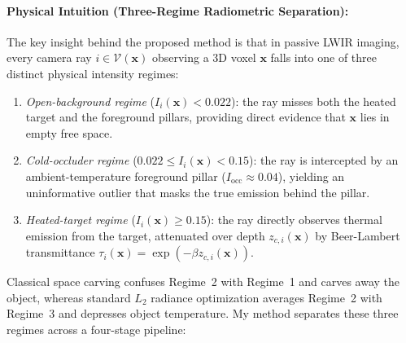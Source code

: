\documentclass[12pt,letterpaper]{article}
\begin{document}
\paragraph{Physical Intuition (Three-Regime Radiometric Separation):}
The key insight behind the proposed method is that in passive LWIR imaging, every camera ray $i \in \mathcal{V}(\mathbf{x})$ observing a 3D voxel $\mathbf{x}$ falls into one of three distinct physical intensity regimes:
\begin{enumerate}
  \item \emph{Open-background regime} ($I_i(\mathbf{x}) < 0.022$): the ray misses both the heated target and the foreground pillars, providing direct evidence that $\mathbf{x}$ lies in empty free space.
  \item \emph{Cold-occluder regime} ($0.022 \le I_i(\mathbf{x}) < 0.15$): the ray is intercepted by an ambient-temperature foreground pillar ($I_{\text{occ}} \approx 0.04$), yielding an uninformative outlier that masks the true emission behind the pillar.
  \item \emph{Heated-target regime} ($I_i(\mathbf{x}) \ge 0.15$): the ray directly observes thermal emission from the target, attenuated over depth $z_{c,i}(\mathbf{x})$ by Beer-Lambert transmittance $\tau_i(\mathbf{x}) = \exp(-\beta z_{c,i}(\mathbf{x}))$.
\end{enumerate}
Classical space carving confuses Regime~2 with Regime~1 and carves away the object, whereas standard $L_2$ radiance optimization averages Regime~2 with Regime~3 and depresses object temperature. My method separates these three regimes across a four-stage pipeline:
\end{document}
